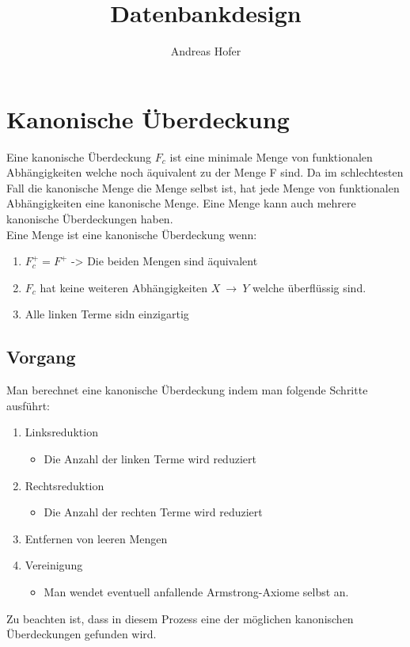 \documentclass{article}
\title{\vspace{-3cm}Datenbankdesign}
\author{Andreas Hofer}
\begin{document}
	\maketitle
	\tableofcontents
	\newpage
	\section{Kanonische Überdeckung}
	Eine kanonische Überdeckung $F_c$ ist eine minimale Menge von funktionalen Abhängigkeiten welche noch äquivalent zu der Menge F sind. Da im schlechtesten Fall die kanonische Menge die Menge selbst ist, hat jede Menge von funktionalen Abhängigkeiten eine kanonische Menge. Eine Menge kann auch mehrere kanonische Überdeckungen haben. \\
	Eine Menge ist eine kanonische Überdeckung wenn:
	\begin{enumerate}
		\item{$F_c^+=F^+$ -> Die beiden Mengen sind äquivalent}
		\item{$F_c$ hat keine weiteren Abhängigkeiten $X\ \to\ Y$ welche überflüssig sind.}
		\item{Alle linken Terme sidn einzigartig}
	\end{enumerate}
	\subsection{Vorgang}
	Man berechnet eine kanonische Überdeckung indem man folgende Schritte ausführt:
	\begin{enumerate}
		\item{Linksreduktion}
		\begin{itemize}
			\item{Die Anzahl der linken Terme wird reduziert}
		\end{itemize}
		\item{Rechtsreduktion}
		\begin{itemize}
			\item{Die Anzahl der rechten Terme wird reduziert}
		\end{itemize}
		\item{Entfernen von leeren Mengen}
		\item{Vereinigung}
		\begin{itemize}
			\item{Man wendet eventuell anfallende Armstrong-Axiome selbst an.}
		\end{itemize}
	\end{enumerate}
	Zu beachten ist, dass in diesem Prozess eine der möglichen kanonischen Überdeckungen gefunden wird.
\end{document}
